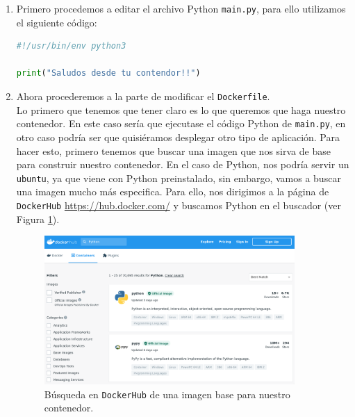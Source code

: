 \documentclass[12pt]{article}
\begin{document}
	\begin{enumerate}
		\item Primero procedemos a editar el archivo Python \texttt{main.py}, para ello utilizamos el siguiente código:
		\begin{lstlisting}[language=Python, caption=Codigo Python de ejemplo para crear un Dockerfile]
#!/usr/bin/env python3

print("Saludos desde tu contendor!!")
		\end{lstlisting}
	
		\item Ahora procederemos a la parte de modificar el \texttt{Dockerfile}. \\
		
		\noindent Lo primero que tenemos que tener claro es lo que queremos que haga nuestro contenedor. En este caso sería que ejecutase el código Python de \texttt{main.py}, en otro caso podría ser que quisiéramos desplegar otro tipo de aplicación. Para hacer esto, primero tenemos que buscar una imagen que nos sirva de base para construir nuestro contenedor. En el caso de Python, nos podría servir un \texttt{ubuntu}, ya que viene con Python preinstalado, sin embargo, vamos a buscar una imagen mucho más especifica. Para ello, nos dirigimos a la página de \texttt{DockerHub} \url{https://hub.docker.com/} y buscamos Python en el buscador (ver Figura \ref{img: dockerhub python}).
	
	\pagebreak
	
	\begin{figure}[h]
		\begin{center}
			\includegraphics[width=0.9\textwidth]{img/dockerhub_python.png}
			\caption{Búsqueda en \texttt{DockerHub} de una imagen base para nuestro contenedor.}
			\label{img: dockerhub python}
		\end{center}
	\end{figure}
	

\end{enumerate}
\end{document}
